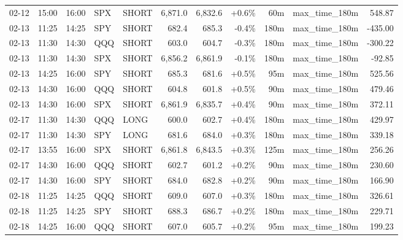 \documentclass[11pt,a4paper,twoside]{article}
\begin{document}
\begin{center}
\begin{longtable}{>{\color{txtmain}}l l l l l r r r r >{\color{txtmain}}l r}
02-12 & 15:00 & 16:00 & SPX & SHORT & 6,871.0 & 6,832.6 & \textcolor{wingreen}{+0.6\%} & 60m & max\_time\_180m & \textcolor{wingreen}{548.87} \\
02-13 & 11:25 & 14:25 & SPY & SHORT & 682.4 & 685.3 & \textcolor{lossred}{-0.4\%} & 180m & max\_time\_180m & \textcolor{lossred}{-435.00} \\
02-13 & 11:30 & 14:30 & QQQ & SHORT & 603.0 & 604.7 & \textcolor{lossred}{-0.3\%} & 180m & max\_time\_180m & \textcolor{lossred}{-300.22} \\
02-13 & 11:30 & 14:30 & SPX & SHORT & 6,856.2 & 6,861.9 & \textcolor{lossred}{-0.1\%} & 180m & max\_time\_180m & \textcolor{lossred}{-92.85} \\
02-13 & 14:25 & 16:00 & SPY & SHORT & 685.3 & 681.6 & \textcolor{wingreen}{+0.5\%} & 95m & max\_time\_180m & \textcolor{wingreen}{525.56} \\
02-13 & 14:30 & 16:00 & QQQ & SHORT & 604.8 & 601.8 & \textcolor{wingreen}{+0.5\%} & 90m & max\_time\_180m & \textcolor{wingreen}{479.46} \\
02-13 & 14:30 & 16:00 & SPX & SHORT & 6,861.9 & 6,835.7 & \textcolor{wingreen}{+0.4\%} & 90m & max\_time\_180m & \textcolor{wingreen}{372.11} \\
02-17 & 11:30 & 14:30 & QQQ & LONG & 600.0 & 602.7 & \textcolor{wingreen}{+0.4\%} & 180m & max\_time\_180m & \textcolor{wingreen}{429.97} \\
02-17 & 11:30 & 14:30 & SPY & LONG & 681.6 & 684.0 & \textcolor{wingreen}{+0.3\%} & 180m & max\_time\_180m & \textcolor{wingreen}{339.18} \\
02-17 & 13:55 & 16:00 & SPX & SHORT & 6,861.8 & 6,843.5 & \textcolor{wingreen}{+0.3\%} & 125m & max\_time\_180m & \textcolor{wingreen}{256.26} \\
02-17 & 14:30 & 16:00 & QQQ & SHORT & 602.7 & 601.2 & \textcolor{wingreen}{+0.2\%} & 90m & max\_time\_180m & \textcolor{wingreen}{230.60} \\
02-17 & 14:30 & 16:00 & SPY & SHORT & 684.0 & 682.8 & \textcolor{wingreen}{+0.2\%} & 90m & max\_time\_180m & \textcolor{wingreen}{166.90} \\
02-18 & 11:25 & 14:25 & QQQ & SHORT & 609.0 & 607.0 & \textcolor{wingreen}{+0.3\%} & 180m & max\_time\_180m & \textcolor{wingreen}{326.61} \\
02-18 & 11:25 & 14:25 & SPY & SHORT & 688.3 & 686.7 & \textcolor{wingreen}{+0.2\%} & 180m & max\_time\_180m & \textcolor{wingreen}{229.71} \\
02-18 & 14:25 & 16:00 & QQQ & SHORT & 607.0 & 605.7 & \textcolor{wingreen}{+0.2\%} & 95m & max\_time\_180m & \textcolor{wingreen}{199.23} \\

\end{longtable}
\end{center}
\end{document}

